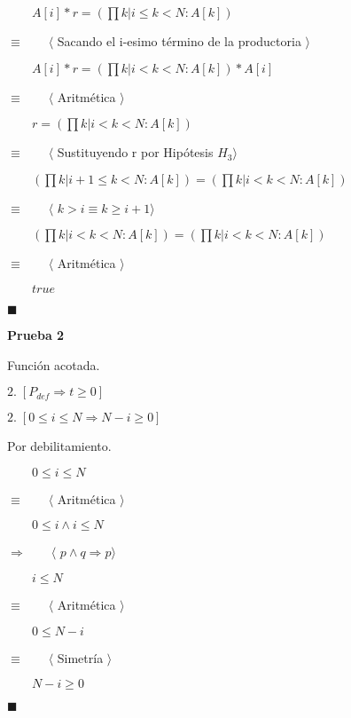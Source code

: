 \documentclass[hidelinks]{article}
\begin{document}
\begin{itemize}
	      $\qquad A[i]*r = (\prod k | i \leq k < N: A[k])$\par
	      $\equiv \qquad \langle$ Sacando el i-esimo término de la productoria $\rangle$\par
	      $\qquad A[i]*r = (\prod k | i < k < N: A[k])*A[i]$\par
	      $\equiv \qquad \langle$ Aritmética $\rangle$\par
	      $\qquad r = (\prod k | i < k < N: A[k])$\par
	      $\equiv \qquad \langle$ Sustituyendo r por Hipótesis $ H_3\rangle$\par
	      $\qquad (\prod k | i + 1 \leq k < N: A[k]) = (\prod k | i < k < N: A[k])$\par
	      $\equiv \qquad \langle$ $k > i \equiv k \geq i + 1\rangle$\par
	      $\qquad (\prod k | i < k < N: A[k]) = (\prod k | i < k < N: A[k])$\par
	      $\equiv \qquad \langle$ Aritmética $\rangle$\par
	      $\qquad true$\par
	      $\blacksquare$\par

	      \textbf{Prueba 2}\par
	      Función acotada.\par
	      $2. \; [P_{def} \Rightarrow t \geq 0]$\par
	      $2. \; [0 \leq i \leq N \Rightarrow N - i \geq 0]$\par

	      Por debilitamiento.\par
	      $\qquad 0 \leq i \leq N$\par
	      $\equiv \qquad \langle$ Aritmética $\rangle$\par
	      $\qquad 0 \leq i \land i \leq N$\par
	      $\Rightarrow \qquad \langle$ $p \land q \Rightarrow p\rangle$\par
	      $\qquad i \leq N$\par
	      $\equiv \qquad \langle$ Aritmética $\rangle$\par
	      $\qquad 0 \leq N - i$\par
	      $\equiv \qquad \langle$ Simetría $\rangle$\par
	      $\qquad N - i \geq 0$\par
	      $\blacksquare$\par

\end{itemize}
\end{document}
